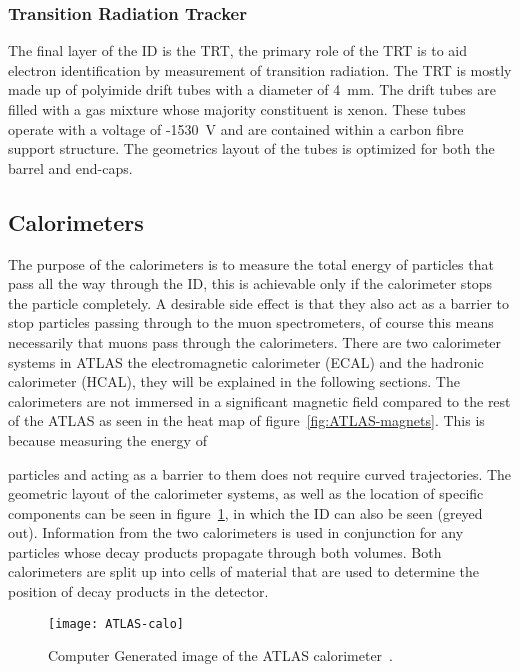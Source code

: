 \subsubsection{Transition Radiation Tracker}

The final layer of the ID is the TRT, the primary role of the TRT is to aid
electron identification by measurement of transition radiation. The TRT is
mostly made up of polyimide drift tubes with a diameter of 4~mm. The drift tubes
are filled with a gas mixture whose majority constituent is xenon. These tubes
operate with a voltage of -1530~V and are contained within a carbon fibre
support structure. The geometrics layout of the tubes is optimized for
both the barrel and end-caps.

\subsection{Calorimeters}%
\label{sec:calo}

The purpose of the calorimeters is to measure the total energy of particles that
pass all the way through the ID, this is achievable only if the calorimeter
stops the particle completely. A desirable side effect is that they also act as
a barrier to stop particles passing through to the muon spectrometers, of course
this means necessarily that muons pass through the calorimeters. There are two
calorimeter systems in ATLAS the electromagnetic calorimeter (ECAL) and the
hadronic calorimeter (HCAL), they will be explained in the following sections.
The calorimeters are not immersed in a significant magnetic field compared to
the rest of the ATLAS as seen in the heat map of figure~\ref{fig:ATLAS-magnets}.
This is because measuring the energy of

particles and acting as a barrier to them does not require curved trajectories.
The geometric layout of the calorimeter systems, as well as the location of
specific components can be seen in figure~\ref{fig:ATLAS-calo}, in which the ID
can also be seen (greyed out). Information from the two calorimeters is used in
conjunction for any particles whose decay products propagate through both
volumes. Both calorimeters are split up into cells of material that are used to
determine the position of decay products in the detector.
\begin{figure}[h]
  \centering
  \texttt{[image: ATLAS-calo]}
  \caption[ATLAS Calorimeter]{Computer Generated image of the ATLAS
    calorimeter~\cite{ATLAS-calo-fig}.}%
  \label{fig:ATLAS-calo}
\end{figure}

